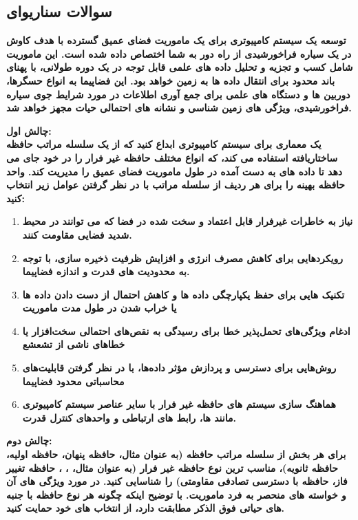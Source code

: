 \documentclass[12pt]{exam}
\begin{document}
\begin{questions}
\section{سوالات سناریوای}
\question
\textbf{توسعه یک سیستم کامپیوتری برای یک ماموریت فضای عمیق گسترده با هدف کاوش در یک سیاره فراخورشیدی از راه دور به شما اختصاص داده شده است. این ماموریت شامل کسب و تجزیه و تحلیل داده های علمی قابل توجه در یک دوره طولانی، با پهنای باند محدود برای انتقال داده ها به زمین خواهد بود. این فضاپیما به انواع حسگرها، دوربین ها و دستگاه های علمی برای جمع آوری اطلاعات در مورد شرایط جوی سیاره فراخورشیدی، ویژگی های زمین شناسی و نشانه های احتمالی حیات مجهز خواهد شد.}


\textbf{چالش اول: }\\
\textbf{یک معماری برای سیستم کامپیوتری ابداع کنید که از یک سلسله مراتب حافظه ساختاریافته استفاده می کند، که انواع مختلف حافظه غیر فرار را در خود جای می دهد تا داده های به دست آمده در طول ماموریت فضای عمیق را مدیریت کند. واحد حافظه بهینه را برای هر ردیف از سلسله مراتب با در نظر گرفتن عوامل زیر انتخاب کنید:}

\begin{enumerate}
	\item
\textbf{	نیاز به خاطرات غیرفرار قابل اعتماد و سخت شده در فضا که می توانند در محیط شدید فضایی مقاومت کنند.}
	
	\item 
\textbf{	رویکردهایی برای کاهش مصرف انرژی و افزایش ظرفیت ذخیره سازی، با توجه به محدودیت های قدرت و اندازه فضاپیما.}
	
	\item 
\textbf{	تکنیک هایی برای حفظ یکپارچگی داده ها و کاهش احتمال از دست دادن داده ها یا خراب شدن در طول مدت ماموریت}
	
	\item 
\textbf{ادغام ویژگی‌های تحمل‌پذیر خطا برای رسیدگی به نقص‌های احتمالی سخت‌افزار یا خطاهای ناشی از تشعشع}
	
	\item 
\textbf{	روش‌هایی برای دسترسی و پردازش مؤثر داده‌ها، با در نظر گرفتن قابلیت‌های محاسباتی محدود فضاپیما}
	
	\item 
\textbf{	هماهنگ سازی سیستم های حافظه غیر فرار با سایر عناصر سیستم کامپیوتری مانند  ها، رابط های ارتباطی و واحدهای کنترل قدرت.}
\end{enumerate}


\textbf{چالش دوم:}\\
\textbf{برای هر بخش از سلسله مراتب حافظه (به عنوان مثال، حافظه پنهان، حافظه اولیه، حافظه ثانویه)، مناسب ترین نوع حافظه غیر فرار (به عنوان مثال، ، ، حافظه تغییر فاز، حافظه با دسترسی تصادفی مقاومتی) را شناسایی کنید. در مورد ویژگی های آن و خواسته های منحصر به فرد ماموریت. با توضیح اینکه چگونه هر نوع حافظه با جنبه های حیاتی فوق الذکر مطابقت دارد، از انتخاب های خود حمایت کنید.}



\end{questions}
\end{document}
